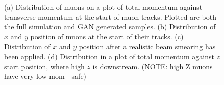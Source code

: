 \documentclass{article}
\begin{document}
    
            

            
            \begin{figure}%
            \centering
            \qquad
            \qquad
            \qquad
            \caption{(a) Distribution of muons on a plot of total momentum against transverse momentum at the start of muon tracks. Plotted are both the full simulation and GAN generated samples. (b) Distribution of $x$ and $y$ position of muons at the start of their tracks. (c) Distribution of $x$ and $y$ position after a realistic beam smearing has been applied. (d) Distribution in a plot of total momentum against $z$ start position, where high $z$ is downstream. (NOTE: high Z muons have very low mom - safe)}%
            \label{2d}%
            \end{figure}
                    
        
\end{document}
